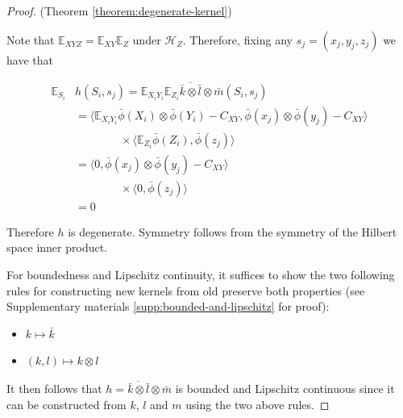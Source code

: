 \documentclass[]{article}
\begin{document}
\begin{proof}(Theorem \ref{theorem:degenerate-kernel})

Note that $\mathbb{E}_{XYZ} = \mathbb{E}_{XY}\mathbb{E}_Z$ under $\mathcal{H}_Z$. Therefore, fixing any $s_j = (x_j,y_j,z_j)$ we have that

\begin{align*}
\mathbb{E}_{S_i}&h(S_i,s_j) = \mathbb{E}_{X_iY_i} \mathbb{E}_{Z_i}\overline{\bar{k}\otimes\bar{l}}\otimes\bar{m} (S_i,s_j) \\
 &=  \langle\mathbb{E}_{X_iY_i}\bar{\phi}(X_i)\otimes\bar{\phi}(Y_i) - C_{XY},\bar{\phi}(x_j)\otimes\bar{\phi}(y_j) - C_{XY}\rangle \\
 &\quad \quad \quad \quad \times \langle \mathbb{E}_{Z_i}\bar{\phi}(Z_i),\bar{\phi}(z_j)\rangle \\
 &=  \langle 0 ,\bar{\phi}(x_j)\otimes\bar{\phi}(y_j) - C_{XY}\rangle \\
 &\quad \quad \quad \quad \times \langle 0 ,\bar{\phi}(z_j)\rangle \\ 
 & = 0
\end{align*}

Therefore $h$ is degenerate. Symmetry follows from the symmetry of the Hilbert space inner product.

For boundedness and Lipschitz continuity, it suffices to show the two following rules for constructing new kernels from old preserve both properties (see Supplementary materials \ref{supp:bounded-and-lipschitz} for proof):
\begin{itemize} \setlength\itemsep{0em}
\item $k \mapsto \bar{k}$ 
\item $(k,l) \mapsto k \otimes l$
\end{itemize}
It then follows that $h = \overline{\bar{k}\otimes\bar{l}}\otimes\bar{m}$ is bounded and Lipschitz continuous since it can be constructed from $k$, $l$ and $m$ using the two above rules.
\end{proof}
\end{document}
